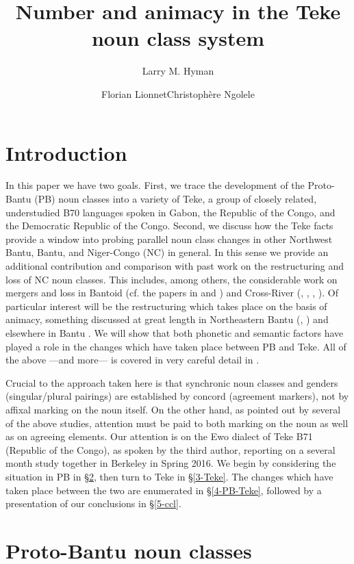 \documentclass[output=paper,,modfonts,nonflat]{langsci/langscibook}
\title{Number and animacy in the Teke noun class system}
\author{Larry M. Hyman\affiliation{University of California, Berkeley}\and  Florian Lionnet\affiliation{Princeton University}\lastand  Christophère Ngolele\affiliation{Université Catholique d'Afrique Centrale, Yaoundé}}
\begin{document}
\maketitle
\section{Introduction} 
\label{intro}

In this paper we have two goals. First, we trace the development of the Proto-Bantu (PB) noun classes into a variety of Teke, a group of closely related, understudied B70 languages spoken in Gabon, the Republic of the Congo, and the Democratic Republic of the Congo. Second, we discuss how the Teke facts provide a window into probing parallel noun class changes in other Northwest Bantu, Bantu, and Niger-Congo (NC) in general. In this sense we provide an additional contribution and comparison with past work on the restructuring and loss of NC noun classes. This includes, among others, the considerable work on mergers and loss in Bantoid (cf. the papers in \cite{Hyman1980}  and \cite{Hymanvoorhoeve1980}) and Cross-River (\cite{Williamson1985}, \cite{Faraclas1986}, \cite{Connell1987}, \cite{Hymanudoh2006}). Of particular interest will be the restructuring which takes place on the basis of animacy, something discussed at great length in Northeastern Bantu (\cite{Wald1975}, \cite{Contini2008}) and elsewhere in Bantu . We will show that both phonetic and semantic factors have played a role in the changes which have taken place between PB and Teke. All of the above ---and more--- is covered in very careful detail in \citet{Good2012}.

Crucial to the approach taken here is that synchronic noun classes and genders (singular/plural pairings) are established by concord (agreement markers), not by affixal marking on the noun itself. On the other hand, as pointed out by several of the above studies, attention must be paid to both marking on the noun as well as on agreeing elements. Our attention is on the Ewo dialect of Teke B71 (Republic of the Congo), as spoken by the third author, reporting on a several month study together in Berkeley in Spring 2016. We begin by considering the situation in PB in \S\ref{2-PB}, then turn to Teke in \S\ref{3-Teke}. The changes which have taken place between the two are enumerated in \S\ref{4-PB-Teke}, followed by a presentation of our conclusions in \S\ref{5-ccl}.


\section{Proto-Bantu noun classes} 
\label{2-PB}
\end{document}
